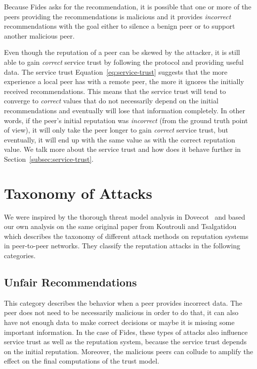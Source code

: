 Because Fides asks for the recommendation, it is possible that one or more of the peers providing the recommendations is malicious and it provides \textit{incorrect} recommendations with the goal either to silence a benign peer or to support another malicious peer.

Even though the reputation of a peer can be skewed by the attacker, it is still able to gain \textit{correct} service trust by following the protocol and providing useful data.
The service trust Equation~\ref{eq:service-trust} suggests that the more experience a local peer has with a remote peer, the more it ignores the initially received recommendations.
This means that the service trust will tend to converge to \textit{correct} values that do not necessarily depend on the initial recommendations and eventually will lose that information completely.
In other words, if the peer's initial reputation was \textit{incorrect} (from the ground truth point of view), it will only take the peer longer to gain \textit{correct} service trust, but eventually, it will end up with the same value as with the correct reputation value.
We talk more about the service trust and how does it behave further in Section~\ref{subsec:service-trust}.

\section{Taxonomy of Attacks}
\label{sec:taxonomy-of-attacks}
We were inspired by the thorough threat model analysis in Dovecot~\cite{dita}  and based our own analysis on the same original paper from Koutrouli and Tsalgatidou~\cite{KOUTROULI201247} which describes the taxonomy of different attack methods on reputation systems in peer-to-peer networks.
They classify the reputation attacks in the following categories.

\subsection{Unfair Recommendations}
\label{subsec:unfair-recommendations}
This category describes the behavior when a peer provides incorrect data.
The peer does not need to be necessarily malicious in order to do that, it can also have not enough data to make correct decisions or maybe it is missing some important information.
In the case of Fides, these types of attacks also influence service trust as well as the reputation system, because the service trust depends on the initial reputation.
Moreover, the malicious peers can collude to amplify the effect on the final computations of the trust model.

